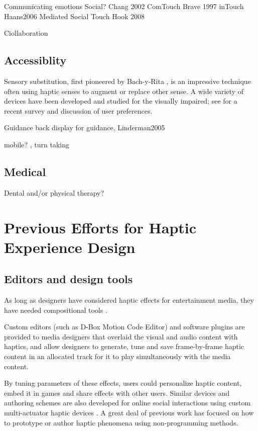 Communicating emotions
Social?
Chang 2002 ComTouch
Brave 1997 inTouch
Haans2006 Mediated Social Touch
Hook 2008

Ciollaboration


\subsection{Accessiblity}
Sensory substitution, first pioneered by Bach-y-Rita \cite{Bach-y-Rita1969}, is an impressive technique often using haptic senses to augment or replace other sense.
A wide variety of devices have been developed and studied for the visually impaired; see \citep{Hamilton-Fletcher2016} for a recent survey and discussion of user preferences.

Guidance \cite{Tan2003} back display for guidance, Linderman2005 \cite{Arab2015} \cite{Prasad2014} \cite{Pielot2009}

mobile? \cite{Brown2006b}, turn taking \cite{Chan2008}


\subsection{Medical}
Dental and/or physical therapy?



%
%
\section{Previous Efforts for Haptic Experience Design}


\subsection{Editors and design tools}
As long as designers have considered haptic effects for entertainment media, they have needed compositional tools %
\cite{Gunther2002}.

Custom editors (such as D-Box Motion Code Editor) and software plugins are provided to media designers that overlaid the visual and audio content with haptics, and allow designers to generate, tune and save frame-by-frame haptic content in an allocated track for it to play simultaneously with the media content. 

By tuning parameters of these effects, users could personalize  haptic content, embed it in games and share effects with other users.
Similar devices and authoring schemes are also developed for online social interactions using custom multi-actuator haptic devices \cite{Kim2009,Tsetserukou2009,Paneels2013}.%
A great deal of previous work has focused on how to prototype or author haptic phenomena using non-programming methods. 

